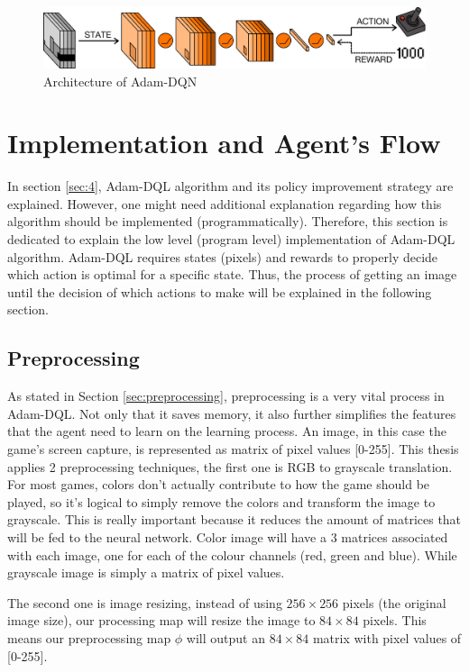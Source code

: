     \begin{figure}[H]
        \centering
        \includegraphics[scale=0.1]{images/dqn.png}
        \caption{Architecture of Adam-DQN}
        \label{fig:43}
    \end{figure}
    
    \iffalse
    \section{Implementation and Agent's Flow}
    In section \ref{sec:4}, Adam-DQL algorithm and its policy improvement strategy are explained. However, one might need additional explanation regarding how this algorithm should be implemented (programmatically). Therefore, this section is dedicated to explain the low level (program level) implementation of Adam-DQL algorithm. Adam-DQL requires states (pixels) and rewards to properly decide which action is optimal for a specific state. Thus, the process of getting an image until the decision of which actions to make will be explained in the following section.
    
    \subsection{Preprocessing}
    
    As stated in Section \ref{sec:preprocessing}, preprocessing is a very vital process in Adam-DQL. Not only that it saves memory, it also further simplifies the features that the agent need to learn on the learning process. An image, in this case the game's screen capture, is represented as matrix of pixel values [0-255]. This thesis applies 2 preprocessing techniques, the first one is RGB to grayscale translation. For most games, colors don't actually contribute to how the game should be played, so it's logical to simply remove the colors and transform the image to grayscale. This is really important because it reduces the amount of matrices that will be fed to the neural network. Color image will have a 3 matrices associated with each image, one for each of the colour channels (red, green and blue). While grayscale image is simply a matrix of pixel values.
    \par
    The second one is image resizing, instead of using $256 \times 256$ pixels (the original image size), our processing map will resize the image to $84 \times 84$ pixels. This means our preprocessing map $\phi$ will output an $84 \times 84$ matrix with pixel values of [0-255]. 
    
